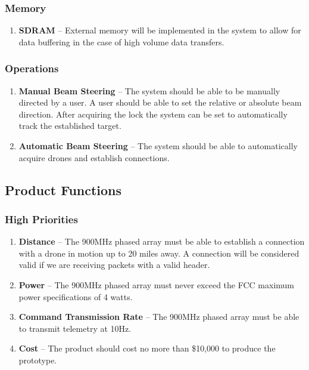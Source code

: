 \documentclass[ProjectRequirements.tex]{subfiles}
\begin{document}
		\subsubsection{Memory}
			\begin{enumerate}\itemsep1pt
				\item \textbf{SDRAM} -- External memory will be implemented in the system to allow for data buffering in the case of high volume data transfers.  
			\end{enumerate}
		
		\subsubsection{Operations}
			\begin{enumerate}\itemsep1pt
				\item \textbf{Manual Beam Steering} -- The system should be able to be manually directed by a user.  A user should be able to set the relative or absolute beam direction.  After acquiring the lock the system can be set to automatically track the established target.
				\item \textbf{Automatic Beam Steering} -- The system should be able to automatically acquire drones and establish connections.
			\end{enumerate}
		
	\subsection{Product Functions}
	
		\subsubsection{High Priorities}
			\begin{enumerate}
				\item \textbf{Distance} -- The 900MHz phased array must be able to establish a connection with a drone in motion up to 20 miles away. A connection will be considered valid if we are receiving packets with a valid header.
				\item \textbf{Power} -- The 900MHz phased array must never exceed the FCC maximum power specifications of 4 watts.
				\item \textbf{Command Transmission Rate} -- The 900MHz phased array must be able to transmit telemetry at 10Hz.
				\item \textbf{Cost} -- The product should cost no more than \$10,000 to produce the prototype.
							
			\end{enumerate}
		
\end{document}
